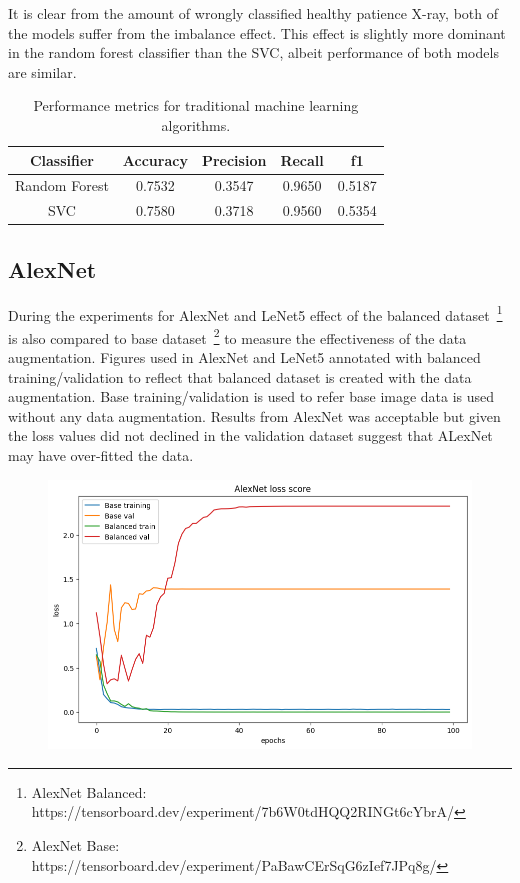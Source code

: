 It is clear from the amount of wrongly classified healthy patience X-ray, both of the models suffer from the imbalance effect.
This effect is slightly more dominant in the random forest classifier than the SVC, albeit performance of both models are similar.

\begin{table}[H]
    \centering
    \begin{tabular}{||c c c c c||} 
    \hline
    Classifier & Accuracy & Precision & Recall & f1\\ [0.5ex] 
    \hline\hline
    Random Forest & 0.7532 & 0.3547 & 0.9650 & 0.5187\\ 
    \hline
    SVC & 0.7580 & 0.3718 & 0.9560 & 0.5354\\
    \hline
    \end{tabular}
    \caption{Performance metrics for traditional machine learning algorithms.}
    \label{table:mlmetrics}
\end{table}



\subsection{AlexNet}
During the experiments for AlexNet and LeNet5 effect of the balanced dataset~\footnote{AlexNet Balanced: https://tensorboard.dev/experiment/7b6W0tdHQQ2RINGt6cYbrA/} is also compared to base dataset~\footnote{AlexNet Base: https://tensorboard.dev/experiment/PaBawCErSqG6zIef7JPq8g/} to measure the effectiveness of the data augmentation.
Figures used in AlexNet and LeNet5 annotated with balanced training/validation to reflect that balanced dataset is created with the data augmentation.
Base training/validation is used to refer base image data is used without any data augmentation.
Results from AlexNet was acceptable but given the loss values did not declined in the validation dataset suggest that ALexNet may have over-fitted the data.

\begin{figure}[H]
    \centering
    \includegraphics[width=.8\textwidth]{img/alexnetloss.png}
    \caption{}
    \label{fig:alexloss}
\end{figure}

